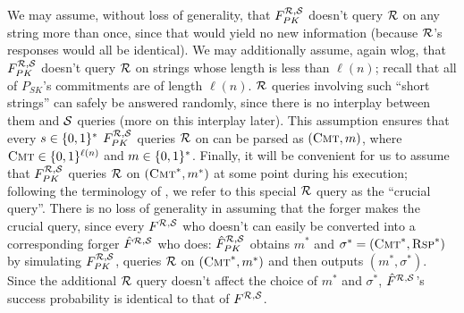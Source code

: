 We may assume, without loss of generality, that $F^{\mathcal{R},\mathcal{S}}_{PK}$ doesn't
query $\mathcal{R}$ on any string more than once, since that would yield no new
information (because $\mathcal{R}$'s responses would all be identical).  We may
additionally assume, again wlog, that $F^{\mathcal{R},\mathcal{S}}_{PK}$ doesn't query
$\mathcal{R}$ on strings whose length is less than $\ell(n)$; recall that all of
$P_{SK}$'s commitments are of length $\ell(n)$.  $\mathcal{R}$ queries involving
such ``short strings'' can safely be answered randomly, since there is no
interplay between them and $\mathcal{S}$ queries (more on this interplay later).
This assumption ensures that every $s \in \{0,1\}^{*}$ $F^{\mathcal{R},\mathcal{S}}_{PK}$
queries $\mathcal{R}$ on can be parsed as $(\textsc{Cmt},m)$, where $\textsc{Cmt}
\in \{0,1\}^{\ell(n)}$ and $m \in \{0,1\}^{*}$.  Finally, it will be convenient for
us to assume that $F^{\mathcal{R},\mathcal{S}}_{PK}$ queries $\mathcal{R}$ on
$(\textsc{Cmt}^*,m^*)$ at some point during his execution; following the
terminology of \cite{abdalla:fiatshamirrom}, we refer to this special $\mathcal{R}$
query as the ``crucial query''. There is no loss of generality in assuming
that the forger makes the crucial query, since every $F^{\mathcal{R},\mathcal{S}}$ who
doesn't can easily be converted into a corresponding forger
$\hat{F}^{\mathcal{R},\mathcal{S}}$ who does: $\hat{F}^{\mathcal{R},\mathcal{S}}_{PK}$ obtains $m^*$
and $\sigma^* = (\textsc{Cmt}^*,\textsc{Rsp}^*)$ by simulating
$F^{\mathcal{R},\mathcal{S}}_{PK}$, queries $\mathcal{R}$ on $(\textsc{Cmt}^*,m^*)$ and then
outputs $(m^*,\sigma^*)$.  Since the additional $\mathcal{R}$ query doesn't affect
the choice of $m^*$ and $\sigma^*$, $\hat{F}^{\mathcal{R},\mathcal{S}}$'s success
probability is identical to that of $F^{\mathcal{R},\mathcal{S}}$.
%
%
